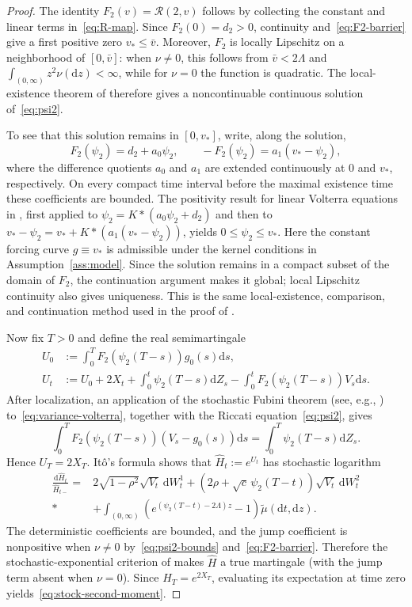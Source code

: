 \documentclass[11pt]{article}
\theoremstyle{definition}
\theoremstyle{remark}
\newcommand{\Rr}{\mathcal{R}}
\newcommand{\1}{\mathbf{1}}
\newcommand{\dd}{\mathrm{d}}
\begin{document}
\begin{proof}
The identity $F_2(v)=\Rr(2,v)$ follows by collecting the constant and linear
terms in~\eqref{eq:R-map}. Since $F_2(0)=d_2>0$, continuity
and~\eqref{eq:F2-barrier} give a first positive zero $v_*\le\bar v$. Moreover,
$F_2$ is locally Lipschitz on a neighborhood of $[0,\bar v]$: when
$\nu\ne0$, this follows from $\bar v<2\Lambda$ and
$\int_{(0,\infty)}z^2\nu(\dd z)<\infty$, while for $\nu=0$ the function is quadratic.
The local-existence theorem of
\citet[Chapter~12, Theorem~1.1]{gripenberg1990} therefore gives a
noncontinuable continuous solution of~\eqref{eq:psi2}.

To see that this solution remains in $[0,v_*]$, write, along the solution,
\[
 F_2(\psi_2)=d_2+a_0\psi_2,
 \qquad
 -F_2(\psi_2)=a_1(v_*-\psi_2),
\]
where the difference quotients $a_0$ and $a_1$ are extended continuously at
$0$ and $v_*$, respectively. On every compact time interval before the
maximal existence time these coefficients are bounded. The positivity result
for linear Volterra equations in
\citet[Theorem~C.1 and Remark~B.6]{abijabereleuch2019}, first applied to
$\psi_2=K*(a_0\psi_2+d_2)$ and then to
$v_*-\psi_2=v_*+K*(a_1(v_*-\psi_2))$, yields
$0\le\psi_2\le v_*$. Here the constant forcing curve $g\equiv v_*$ is
admissible under the kernel conditions in Assumption~\ref{ass:model}. Since
the solution remains in a compact subset of the domain of $F_2$, the
continuation argument makes it global; local Lipschitz continuity also gives
uniqueness. This is the same local-existence, comparison, and continuation
method used in the proof of \citet[Theorem~3.1]{bondi2024}.

Now fix $T>0$ and define the real semimartingale
\begin{align*}
 U_0&:=\int_0^T F_2\left(\psi_2(T-s)\right)g_0(s)\dd s,\\
 U_t&:=U_0+2X_t+\int_0^t\psi_2(T-s)\dd Z_s
       -\int_0^tF_2\left(\psi_2(T-s)\right)V_s\dd s.
\end{align*}
 After localization, an application of the stochastic Fubini theorem (see, e.g.,
 \citet[Theorem~IV.65]{protter2005}) to~\eqref{eq:variance-volterra},
 together with the Riccati equation~\eqref{eq:psi2}, gives
\[
 \int_0^T F_2\left(\psi_2(T-s)\right)(V_s-g_0(s))\dd s
 =\int_0^T\psi_2(T-s)\dd Z_s.
\]
Hence $U_T=2X_T$. It\^o's formula shows that $\widehat H_t:=e^{U_t}$
has stochastic logarithm
\begin{align*}
 \frac{\dd\widehat H_t}{\widehat H_{t-}}
 ={}&2\sqrt{1-\rho^2}\sqrt{V_t}\,\dd W_t^1
   +\left(2\rho+\sqrt c\,\psi_2(T-t)\right)
      \sqrt{V_t}\,\dd W_t^2 \\*
 &+\int_{(0,\infty)}
   \left(e^{(\psi_2(T-t)-2\Lambda)z}-1\right)
   \widetilde\mu(\dd t,\dd z).
\end{align*}
The deterministic coefficients are bounded, and the jump coefficient is
nonpositive when $\nu\ne0$ by~\eqref{eq:psi2-bounds}
and~\eqref{eq:F2-barrier}. Therefore the stochastic-exponential criterion
of \citet[Lemma~3.2]{bondi2024} makes $\widehat H$ a true martingale (with the
jump term absent when $\nu=0$). Since $\widehat H_T=e^{2X_T}$, evaluating its
expectation at time zero yields~\eqref{eq:stock-second-moment}.
\end{proof}
\end{document}
